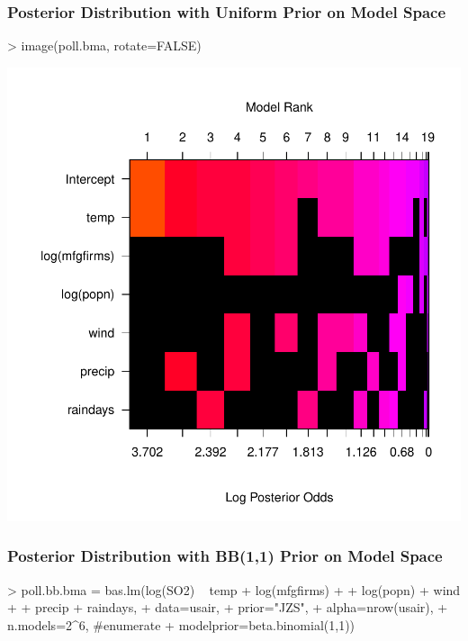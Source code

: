 \documentclass[]{beamer}
\begin{document}
\begin{frame}[fragile]\frametitle{Posterior Distribution  with Uniform Prior on Model Space}


\begin{Schunk}
\begin{Sinput}
> image(poll.bma, rotate=FALSE)
\end{Sinput}
\end{Schunk}
\includegraphics{16-bma-004}


\end{frame}



\begin{frame}[fragile]\frametitle{Posterior Distribution  with BB(1,1) Prior on Model Space}


\begin{Schunk}
\begin{Sinput}
> poll.bb.bma = bas.lm(log(SO2) ~ temp + log(mfgfirms) +
+                                 log(popn) + wind +
+                                 precip + raindays,
+                      data=usair,
+                      prior="JZS",
+                      alpha=nrow(usair),
+                      n.models=2^6,  #enumerate
+                      modelprior=beta.binomial(1,1))
\end{Sinput}
\end{Schunk}

\end{frame}
\end{document}
